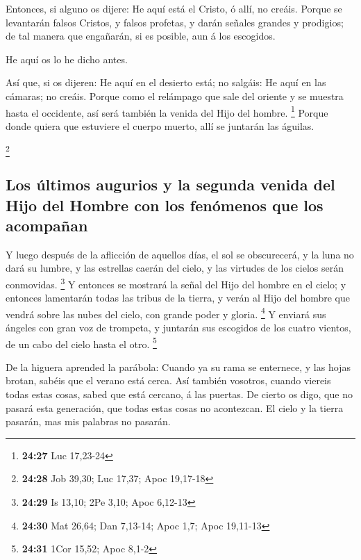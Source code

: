  Entonces, si alguno os dijere: He aquí está el Cristo, ó
allí, no creáis.  Porque se levantarán falsos Cristos, y
falsos profetas, y darán señales grandes y prodigios; de tal manera que
engañarán, si es posible, aun á los escogidos.

 He aquí os lo he dicho antes.

 Así que, si os dijeren: He aquí en el desierto está; no
salgáis: He aquí en las cámaras; no creáis.  Porque como
el relámpago que sale del oriente y se muestra hasta el occidente, así
será también la venida del Hijo del hombre. \footnote{\textbf{24:27} Luc
  17,23-24}  Porque donde quiera que estuviere el cuerpo
muerto, allí se juntarán las águilas.

\footnote{\textbf{24:28} Job 39,30; Luc 17,37; Apoc 19,17-18}

\hypertarget{los-uxfaltimos-augurios-y-la-segunda-venida-del-hijo-del-hombre-con-los-fenuxf3menos-que-los-acompauxf1an}{%
\subsection{Los últimos augurios y la segunda venida del Hijo del Hombre
con los fenómenos que los
acompañan}\label{los-uxfaltimos-augurios-y-la-segunda-venida-del-hijo-del-hombre-con-los-fenuxf3menos-que-los-acompauxf1an}}

 Y luego después de la aflicción de aquellos días, el sol
se obscurecerá, y la luna no dará su lumbre, y las estrellas caerán del
cielo, y las virtudes de los cielos serán conmovidas. \footnote{\textbf{24:29}
  Is 13,10; 2Pe 3,10; Apoc 6,12-13}  Y entonces se
mostrará la señal del Hijo del hombre en el cielo; y entonces lamentarán
todas las tribus de la tierra, y verán al Hijo del hombre que vendrá
sobre las nubes del cielo, con grande poder y gloria. \footnote{\textbf{24:30}
  Mat 26,64; Dan 7,13-14; Apoc 1,7; Apoc 19,11-13}  Y
enviará sus ángeles con gran voz de trompeta, y juntarán sus escogidos
de los cuatro vientos, de un cabo del cielo hasta el otro. \footnote{\textbf{24:31}
  1Cor 15,52; Apoc 8,1-2}

 De la higuera aprended la parábola: Cuando ya su rama se
enternece, y las hojas brotan, sabéis que el verano está cerca.
 Así también vosotros, cuando viereis todas estas cosas,
sabed que está cercano, á las puertas.  De cierto os
digo, que no pasará esta generación, que todas estas cosas no
acontezcan.  El cielo y la tierra pasarán, mas mis
palabras no pasarán.

